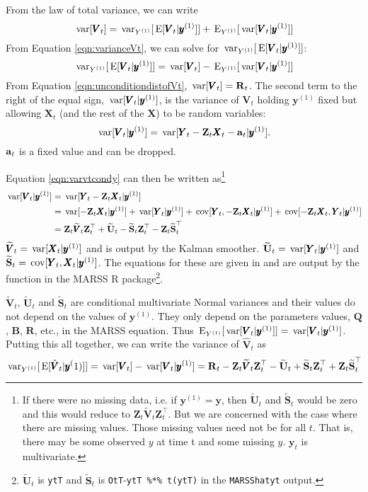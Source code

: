 \documentclass[]{article}
\def\UPS{\mbox{\boldmath $\Upsilon$}}
\def\XI{\mbox{\boldmath $\Xi$}}
\def\BB{\mbox{$\mathbf B$}}	\def\bb{\mbox{$\mathbf b$}} \def\Bb{\mbox{$\mathbf J$}} \def\Ba{\mbox{$\mathbf L$}} \def\Bm{\UPS}
\def\E{\,\textup{\textrm{E}}}
\def\QQ{\mbox{$\mathbf Q$}}	 \def\qq{\mbox{$\mathbf q$}} \def\Qb{\mbox{$\mathbf G$}}  \def\Qm{\mathbb{Q}}
\def\RR{\mbox{$\mathbf R$}}	 \def\rr{\mbox{$\mathbf r$}} \def\Rb{\mbox{$\mathbf H$}}	\def\Rm{\mathbb{R}}
\def\Ss{\mbox{$\mathbf S$}}
\def\UU{\mbox{$\mathbf U$}}	\def\uu{\mbox{$\mathbf u$}}
\def\VV{\mbox{$\pmb{V}$}}	\def\vv{\mbox{$\pmb{v}$}}
\def\XX{\mbox{$\pmb{X}$}}	\def\xx{\mbox{$\pmb{x}$}}
\def\YY{\mbox{$\pmb{Y}$}}	\def\yy{\mbox{$\pmb{y}$}}
\def\ZZ{\mbox{$\mathbf Z$}}	\def\zz{\mbox{$\mathbf z$}}	\def\Zb{\mbox{$\mathbf M$}} \def\Za{\mbox{$\mathbf N$}} \def\Zm{\XI}
\def\var{\,\textup{\textrm{var}}}
\def\cov{\,\textup{\textrm{cov}}}
\def\hatVt{\widetilde{\VV}_t}
\def\hatUt{\widetilde{\UU}_t}
\def\hatSt{\widetilde{\Ss}_t}
\begin{document}
From the law of total variance, we can write
\begin{equation}\label{eqn:varianceVt}
\var[\VV_t] = \var_{Y^{(1)}}[\E[\VV_t|\yy^{(1)}]] + \E_{Y^{(1)}}[\var[\VV_t|\yy^{(1)}]]
\end{equation}
From Equation \ref{eqn:varianceVt}, we can solve for $\var_{Y^{(1)}}[\E[\VV_t|\yy^{(1)}]]$:
\begin{equation}
\var_{Y^{(1)}}[\E[\VV_t|\yy^{(1)}]] = \var[\VV_t] - \E_{Y^{(1)}}[\var[\VV_t|\yy^{(1)}]]
\end{equation}
From Equation \ref{eqn:unconditiondistofVt}, $\var[\VV_t]=\RR_t$.  The second term to the right of the equal sign, $\var[\VV_t|\yy^{(1)}]$, is the variance of $\VV_t$ holding $\yy^{(1)}$ fixed but allowing $\XX_t$ (and the rest of the $\XX$) to be random variables:
\begin{equation}\label{eqn:varvtcondy}
\var[\VV_t|\yy^{(1)}] = \var[ \YY_t - \ZZ_t\XX_t-\aa_t | \yy^{(1)} ].
\end{equation}
$\aa_t$ is a fixed value and can be dropped. 

Equation \ref{eqn:varvtcondy} can then be written as\footnote{If there were no missing data, i.e. if $\yy^{(1)}=\yy$, then $\hatUt$ and $\hatSt$ would be zero and this would reduce to $\ZZ_t \hatVt \ZZ_t^\top$. But we are concerned with the case where there are missing values. Those missing values need not be for all $t$. That is, there may be some observed $y$ at time t and some missing $y$. $\yy_t$ is multivariate.}
\begin{equation}
\begin{split}
\var[\VV_t|\yy^{(1)}] &= \var[ \YY_t - \ZZ_t\XX_t | \yy^{(1)} ]\\
&=\var[ - \ZZ_t\XX_t | \yy^{(1)} ] + \var[ \YY_t|\yy^{(1)}] + \cov[ \YY_t, - \ZZ_t\XX_t | \yy^{(1)} ] + \cov[ - \ZZ_t\XX_t, \YY_t | \yy^{(1)} ]\\
&=\ZZ_t \hatVt \ZZ_t^\top + \hatUt - \hatSt\ZZ_t^\top - \ZZ_t\hatSt^\top
\end{split}
\end{equation}
$\hatVt = \var[ \XX_t | \yy^{(1)} ]$ and is output by the Kalman smoother. $\hatUt=\var[\YY_t|\yy^{(1)}]$ and $\hatSt=\cov[\YY_t,\XX_t|\yy^{(1)}]$. The equations for these are given in \citet{Holmes2010} and are output by the \verb@MARSShatyt@ function in the MARSS R package\footnote{$\hatUt$ is \texttt{ytT} and $\hatSt$ is \texttt{OtT}-\texttt{ytT \%*\% t(ytT)} in the \texttt{MARSShatyt} output.}.

$\hatVt$, $\hatUt$ and $\hatSt$ are conditional multivariate Normal variances and their values do not depend on the values of $\yy^{(1)}$.  They only depend on the parameters values, $\QQ$, $\BB$, $\RR$, etc., in the MARSS equation. Thus $\E_{Y^{(1)}}[\var[\VV_t|\yy^{(1)}]] = \var[\VV_t|\yy^{(1)}]$. Putting this all together, we can write the variance of $\hat{\VV}_t$ as
\begin{equation}\label{eqn:conditionalvtfinal}
\var_{Y^{(1)}}[\E[\hat{\VV}_t|\yy^(1)]]  = \var[\VV_t] - \var[\VV_t|\yy^{(1)}] = \RR_t - \ZZ_t \hatVt \ZZ_t^\top - \hatUt + \hatSt\ZZ_t^\top + \ZZ_t\hatSt^\top
\end{equation}
\end{document}
